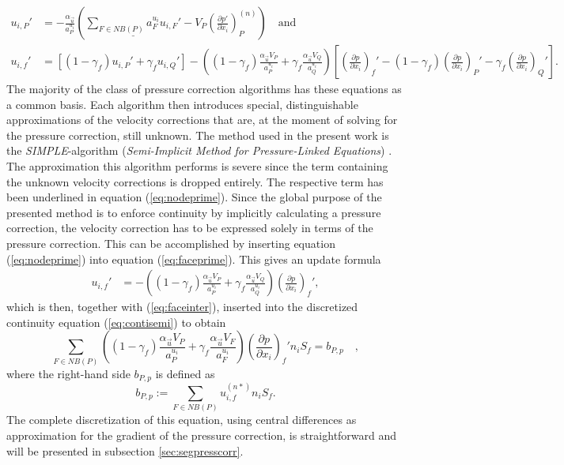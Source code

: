\begin{align}
  \label{eq:nodeprime}
  u_{i,P}' 
  &=  
  - \frac{\alpha_{\vec{u}}}{a_P^{u_i}} \left(\underline{\sum_{F \in NB(P)} a_F^{u_i} u_{i,F}'}
  - V_P\left(\frac{\partial p'}{\partial x_i}\right)_P^{(n)} \right) \quad \text{and}\\[1em]
  \label{eq:faceprime}
  u_{i,f}' 
  &= 
  \left[\left(1 - \gamma_f\right) u_{i,P}' + \gamma_f u_{i,Q}' \right] 
  - 
  \left(\left(1 - \gamma_f\right) \frac{\alpha_\vec{u} V_P}{a_P^{u_i}} + \gamma_f \frac{\alpha_\vec{u} V_Q}{a_Q^{u_i}}\right)
  \left[ 
  \left(\frac{\partial p}{\partial x_i}\right)_f' 
  - \left( 1 - \gamma_f \right) \left( \frac{\partial p}{\partial x_i} \right)_P' 
  - \gamma_f \left(\frac{\partial p}{\partial x_i}\right)_Q' 
  \right].
\end{align}
The majority of the class of pressure correction algorithms has these equations as a common basis. Each algorithm then introduces special, distinguishable approximations of the velocity corrections that are, at the moment of solving for the pressure correction, still unknown. The method used in the present work is the \emph{SIMPLE}-algorithm (\emph{Semi-Implicit Method for Pressure-Linked Equations}) \cite{patankar72}. The approximation this algorithm performs is severe since the term containing the unknown velocity corrections is dropped entirely. The respective term has been underlined in equation (\ref{eq:nodeprime}). Since the global purpose of the presented method is to enforce continuity by implicitly calculating a pressure correction, the velocity correction has to be expressed solely in terms of the pressure correction. This can be accomplished by inserting equation (\ref{eq:nodeprime}) into equation (\ref{eq:faceprime}). This gives an update formula
\begin{align}
  \label{eq:velcorr}
  u_{i,f}' 
  &= 
  - \left(\left(1 - \gamma_f\right) \frac{\alpha_\vec{u} V_P}{a_P^{u_i}} + \gamma_f \frac{\alpha_\vec{u} V_Q}{a_Q^{u_i}}\right)
  \left(\frac{\partial p}{\partial x_i}\right)_f',
\end{align}
which is then, together with (\ref{eq:faceinter}), inserted into the discretized continuity equation (\ref{eq:contisemi}) to obtain
\begin{equation}
  \label{eq:presscorr}
  \sum_{F \in NB(P)} \left(\left(1 - \gamma_f\right) \frac{\alpha_\vec{u} V_P}{a_P^{u_i}} + \gamma_f \frac{\alpha_\vec{u} V_F}{a_F^{u_i}}\right)
  \left(\frac{\partial p}{\partial x_i}\right)_f' n_i S_f
  = b_{P,p}
  \quad,
\end{equation}
where the right-hand side \(b_{P,p}\) is defined as
\begin{equation}
  \label{eq:presscorrb}
  b_{P,p} := \sum_{F \in NB(P)} u_{i,f}^{(n*)} n_i S_f.
\end{equation}
The complete discretization of this equation, using central differences as approximation for the gradient of the pressure correction, is straightforward and will be presented in subsection \ref{sec:segpresscorr}.

